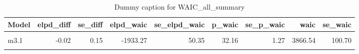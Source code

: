 \begin{table}
\centering
\caption{Dummy caption for WAIC_all_summary}
\centering
\fontsize{10}{12}\selectfont
\begin{tabular}[t]{lrrrrrrrr}
\toprule
Model & elpd\_diff & se\_diff & elpd\_waic & se\_elpd\_waic & p\_waic & se\_p\_waic & waic & se\_waic\\
\midrule
\cellcolor{gray!10}{m2} & \cellcolor{gray!10}{0.00} & \cellcolor{gray!10}{0.00} & \cellcolor{gray!10}{-1933.25} & \cellcolor{gray!10}{50.34} & \cellcolor{gray!10}{32.12} & \cellcolor{gray!10}{1.27} & \cellcolor{gray!10}{3866.50} & \cellcolor{gray!10}{100.68}\\
m3.1 & -0.02 & 0.15 & -1933.27 & 50.35 & 32.16 & 1.27 & 3866.54 & 100.70\\
\cellcolor{gray!10}{m4} & \cellcolor{gray!10}{-3.13} & \cellcolor{gray!10}{1.85} & \cellcolor{gray!10}{-1936.38} & \cellcolor{gray!10}{50.40} & \cellcolor{gray!10}{36.65} & \cellcolor{gray!10}{1.49} & \cellcolor{gray!10}{3872.75} & \cellcolor{gray!10}{100.79}\\
\bottomrule
\end{tabular}
\end{table}
